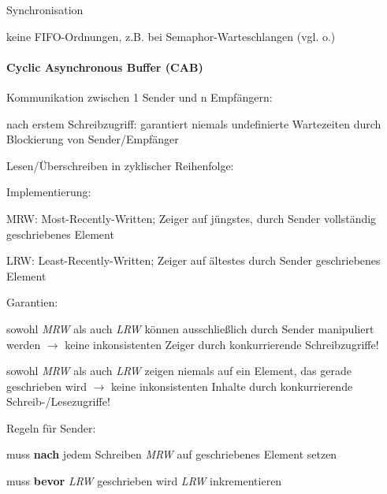 \documentclass[a4paper]{article}
\begin{document}
\begin{multicols}{3}
\begin{itemize*}
\begin{enumerate*}
            \item Synchronisation
        \end{enumerate*}
        \begin{itemize*}
            \item keine FIFO-Ordnungen, z.B. bei Semaphor-Warteschlangen (vgl. o.)
        \end{itemize*}
    \end{itemize*}


    \paragraph{Cyclic Asynchronous Buffer
        (CAB)}

    Kommunikation zwischen 1 Sender und n Empfängern:

    \begin{itemize*}
        \item nach erstem Schreibzugriff: garantiert niemals undefinierte
        Wartezeiten durch Blockierung von Sender/Empfänger
        \item Lesen/Überschreiben in zyklischer Reihenfolge:
        \item Implementierung:
        \begin{itemize*}
            \item MRW: Most-Recently-Written; Zeiger auf jüngstes, durch Sender vollständig geschriebenes Element
            \item LRW: Least-Recently-Written; Zeiger auf ältestes durch Sender geschriebenes Element
            \item Garantien: \begin{itemize*} \item sowohl \emph{MRW} als auch \emph{LRW} können ausschließlich durch Sender manipuliert werden $\rightarrow$ keine inkonsistenten Zeiger durch konkurrierende Schreibzugriffe! \item sowohl \emph{MRW} als auch \emph{LRW} zeigen niemals auf ein Element, das gerade geschrieben wird $\rightarrow$ keine inkonsistenten Inhalte durch konkurrierende Schreib-/Lesezugriffe! \end{itemize*}
            \item Regeln für Sender: \begin{itemize*} \item muss \textbf{nach} jedem Schreiben \emph{MRW} auf geschriebenes Element setzen \item muss \textbf{bevor} \emph{LRW} geschrieben wird \emph{LRW} inkrementieren \end{itemize*}

\end{itemize*}
\end{itemize*}
\end{multicols}
\end{document}
